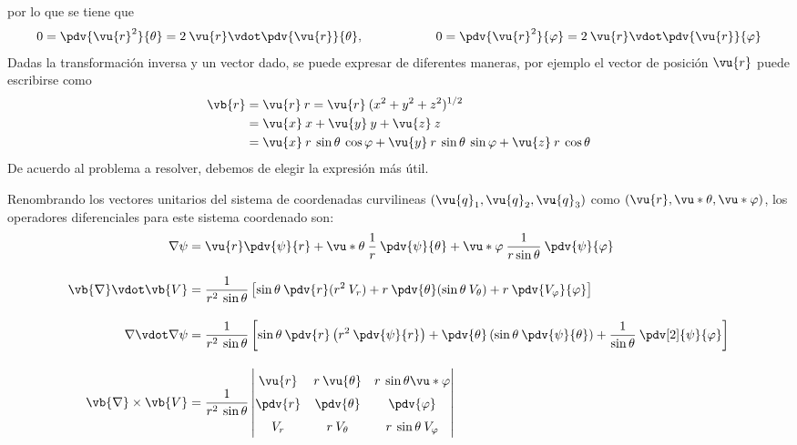 por lo que se tiene que
\begin{align*}
0 = \pdv{\vu{r}^{2}}{\theta} =  2 \: \vu{r} \vdot \pdv{\vu{r}}{\theta}, \hspace{2cm} 0 = \pdv{\vu{r}^{2}}{\varphi} =  2 \: \vu{r} \vdot \pdv{\vu{r}}{\varphi}
\end{align*}
Dadas la transformación inversa y un vector dado, se puede expresar de diferentes maneras, por ejemplo el vector de posición $\vu{r}$ puede escribirse como
\begin{align*}
\vb{r} &= \vu{r} \: r = \vu{r} \: (x^{2} + y^{2} + z^{2})^{1/2} \\
&= \vu{x} \: x + \vu{y} \: y + \vu{z} \: z  \\
&= \vu{x} \: r \: \sin \theta \: \cos \varphi + \vu{y} \: r \:  \sin \theta \: \sin \varphi + \vu{z} \: r \:  \cos \theta    
\end{align*}
De  acuerdo al problema a resolver, debemos de elegir la expresión más útil.
\par
Renombrando los vectores unitarios del sistema de coordenadas curvilineas $(\vu{q}_{1}, \vu{q}_{2}, \vu{q}_{3}) $ como $(\vu{r}, \vu*{\theta}, \vu*{\varphi})$, los operadores diferenciales para este sistema coordenado son:
\begin{align}
\nabla \psi &= \vu{r} \pdv{\psi}{r} + \vu*{\theta} \: \dfrac{1}{r} \: \pdv{\psi}{\theta} + \vu*{\varphi} \: \dfrac{1}{r \sin \theta} \: \pdv{\psi}{\varphi} \\[1em]
\vb{\nabla} \vdot \vb{V} &= \dfrac{1}{r^{2} \: \sin \theta} \left[ \sin \theta \: \pdv{r}(r^{2} \: V_{r}) + r \: \pdv{\theta} (\sin \theta \: V_{\theta}) + r \: \pdv{V_{\varphi}}{\varphi} \right] \\[1em]
\nabla \vdot \nabla \psi &= \dfrac{1}{r^{2} \: \sin \theta} \left[ \sin \theta \: \pdv{r} \left( r^{2} \: \pdv{\psi}{r} \right) + \pdv{\theta} \left( \sin \theta \: \pdv{\psi}{\theta} \right) + \dfrac{1}{\sin \theta} \: \pdv[2]{\psi}{\varphi} \right] \\[1em]
\vb{\nabla} \times \vb{V} &= \dfrac{1}{r^{2} \: \sin \theta}
\renewcommand\arraystretch{1.5} \begin{vmatrix}
\vu{r} & r \: \vu{\theta} & r \: \sin \theta \vu*{\varphi} \\
\displaystyle \pdv{r} & \displaystyle \pdv{\theta} & \displaystyle \pdv{\varphi} \\
V_{r} & r \: V_{\theta} & r \: \sin \theta \: V_{\varphi}
\end{vmatrix}
\end{align}

